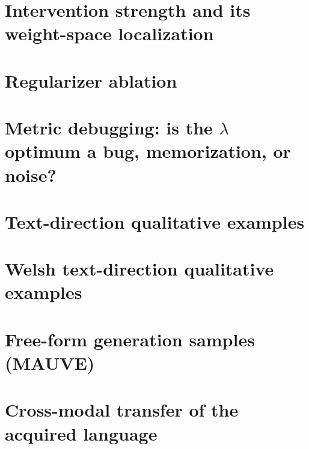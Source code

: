 \documentclass{article}
\begin{document}
\section{Intervention strength and its weight-space localization}\label{app:dw}
\section{Regularizer ablation}\label{app:reg}
\section{Metric debugging: is the $\lambda$ optimum a bug, memorization, or noise?}\label{app:metricdebug}
\section{Text-direction qualitative examples}\label{app:textqual}
\section{Welsh text-direction qualitative examples}\label{app:welsh}
\section{Free-form generation samples (MAUVE)}\label{app:mauve}
\section{Cross-modal transfer of the acquired language}\label{app:xmodal}
\end{document}
